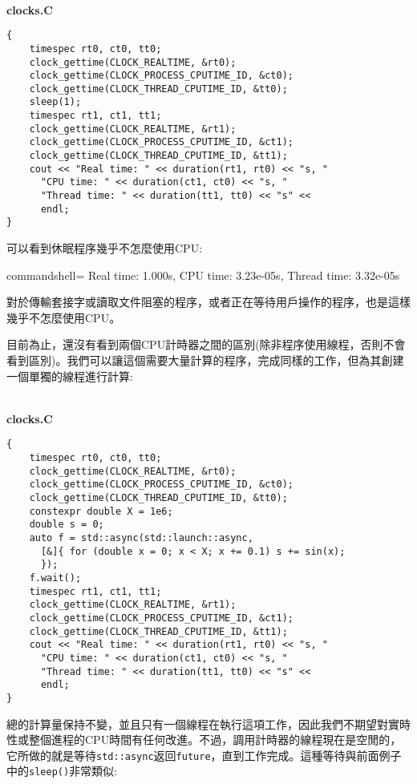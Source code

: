 \hspace*{\fill} \\ %
\noindent
\textbf{clocks.C}
\begin{lstlisting}[style=styleCXX]
{
	timespec rt0, ct0, tt0;
	clock_gettime(CLOCK_REALTIME, &rt0);
	clock_gettime(CLOCK_PROCESS_CPUTIME_ID, &ct0);
	clock_gettime(CLOCK_THREAD_CPUTIME_ID, &tt0);
	sleep(1);
	timespec rt1, ct1, tt1;
	clock_gettime(CLOCK_REALTIME, &rt1);
	clock_gettime(CLOCK_PROCESS_CPUTIME_ID, &ct1);
	clock_gettime(CLOCK_THREAD_CPUTIME_ID, &tt1);
	cout << "Real time: " << duration(rt1, rt0) << "s, "
	  "CPU time: " << duration(ct1, ct0) << "s, "
	  "Thread time: " << duration(tt1, tt0) << "s" <<
  	  endl;
}
\end{lstlisting}

可以看到休眠程序幾乎不怎麼使用CPU:

\begin{tcblisting}{commandshell={}}
Real time: 1.000s, CPU time: 3.23e-05s, Thread time: 3.32e-05s
\end{tcblisting}

對於傳輸套接字或讀取文件阻塞的程序，或者正在等待用戶操作的程序，也是這樣幾乎不怎麼使用CPU。

目前為止，還沒有看到兩個CPU計時器之間的區別(除非程序使用線程，否則不會看到區別)。我們可以讓這個需要大量計算的程序，完成同樣的工作，但為其創建一個單獨的線程進行計算:

\hspace*{\fill} \\ %
\noindent
\textbf{clocks.C}
\begin{lstlisting}[style=styleCXX]
{
	timespec rt0, ct0, tt0;
	clock_gettime(CLOCK_REALTIME, &rt0);
	clock_gettime(CLOCK_PROCESS_CPUTIME_ID, &ct0);
	clock_gettime(CLOCK_THREAD_CPUTIME_ID, &tt0);
	constexpr double X = 1e6;
	double s = 0;
	auto f = std::async(std::launch::async,
	  [&]{ for (double x = 0; x < X; x += 0.1) s += sin(x);
	  });
	f.wait();
	timespec rt1, ct1, tt1;
	clock_gettime(CLOCK_REALTIME, &rt1);
	clock_gettime(CLOCK_PROCESS_CPUTIME_ID, &ct1);
	clock_gettime(CLOCK_THREAD_CPUTIME_ID, &tt1);
	cout << "Real time: " << duration(rt1, rt0) << "s, "
	  "CPU time: " << duration(ct1, ct0) << "s, "
	  "Thread time: " << duration(tt1, tt0) << "s" <<
	  endl;
}
\end{lstlisting}

總的計算量保持不變，並且只有一個線程在執行這項工作，因此我們不期望對實時性或整個進程的CPU時間有任何改進。不過，調用計時器的線程現在是空閒的，它所做的就是等待\texttt{std::async}返回\texttt{future}，直到工作完成。這種等待與前面例子中的\texttt{sleep()}非常類似:

